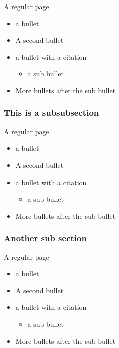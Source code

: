 \documentclass{beamer}
\begin{document}
\begin{frame}{A regular page}
    \begin{itemize}
        \item {
        a bullet
        }
        \item A second bullet
        \item a bullet with a citation \cite{Bonaccorsi2016}
        \begin{itemize}
            \item a sub bullet
        \end{itemize}
        \item More bullets after the sub bullet
    \end{itemize}
\end{frame}


\subsubsection{This is a subsubsection}
\begin{frame}{A regular page}
    \begin{itemize}
        \item {
        a bullet
        }
        \item A second bullet
        \item a bullet with a citation \cite{Bonaccorsi2016}
        \begin{itemize}
            \item a sub bullet
        \end{itemize}
        \item More bullets after the sub bullet
    \end{itemize}
\end{frame}

\subsubsection{Another sub section}
\begin{frame}{A regular page}
    \begin{itemize}
        \item {
        a bullet
        }
        \item A second bullet
        \item a bullet with a citation \cite{Bonaccorsi2016}
        \begin{itemize}
            \item a sub bullet
        \end{itemize}
        \item More bullets after the sub bullet
    \end{itemize}
\end{frame}
\end{document}
